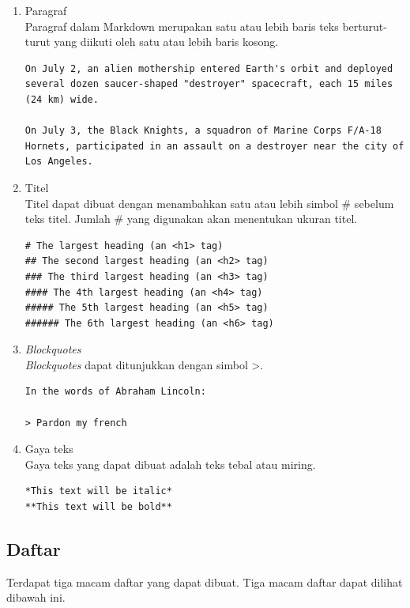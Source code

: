 \begin{enumerate}
\item Paragraf\\
Paragraf dalam Markdown merupakan satu atau lebih baris teks berturut-turut yang diikuti oleh satu atau lebih baris kosong.
\begin{lstlisting}
On July 2, an alien mothership entered Earth's orbit and deployed several dozen saucer-shaped "destroyer" spacecraft, each 15 miles (24 km) wide.

On July 3, the Black Knights, a squadron of Marine Corps F/A-18 Hornets, participated in an assault on a destroyer near the city of Los Angeles.
\end{lstlisting}
\item Titel\\
Titel dapat dibuat dengan menambahkan satu atau lebih simbol \# sebelum teks titel. Jumlah \# yang digunakan akan menentukan ukuran titel.
\begin{lstlisting}
# The largest heading (an <h1> tag)
## The second largest heading (an <h2> tag)
### The third largest heading (an <h3> tag)
#### The 4th largest heading (an <h4> tag)
##### The 5th largest heading (an <h5> tag)
###### The 6th largest heading (an <h6> tag)
\end{lstlisting}
\item {\it Blockquotes}\\
{\it Blockquotes} dapat ditunjukkan dengan simbol >.
\begin{lstlisting}
In the words of Abraham Lincoln:

> Pardon my french
\end{lstlisting}
\item Gaya teks\\
Gaya teks yang dapat dibuat adalah teks tebal atau miring.
\begin{lstlisting}
*This text will be italic*
**This text will be bold**
\end{lstlisting}
\end{enumerate}

\subsection{Daftar}
Terdapat tiga macam daftar yang dapat dibuat. Tiga macam daftar dapat dilihat dibawah ini.

